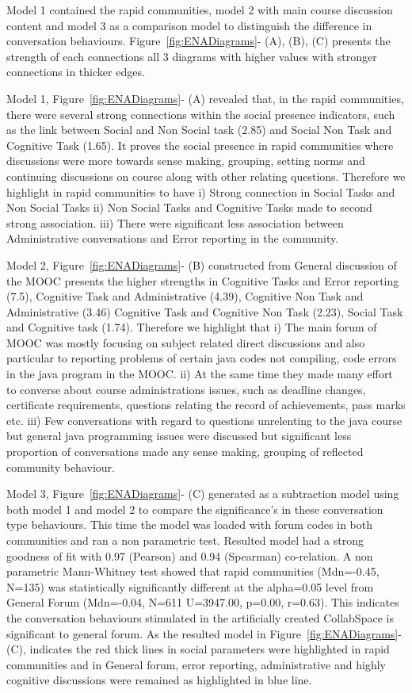 \documentclass[manuscript,screen,review]{acmart}
\begin{document}
Model 1 contained the rapid communities, model 2 with main course discussion content and model 3 as a comparison model to distinguish the difference in conversation behaviours.  Figure~\ref{fig:ENADiagrams}- (A), (B), (C) presents the strength of each connections all 3 diagrams with higher values with stronger connections in thicker edges. 

Model 1, Figure~\ref{fig:ENADiagrams}- (A) revealed that, in the rapid communities, there were several strong connections within the social presence indicators, such as the link between Social and Non Social task (2.85) and Social Non Task and Cognitive Task (1.65). It proves the social presence in rapid communities where discussions were more towards sense making, grouping, setting norms and continuing discussions on course along with other relating questions. Therefore we highlight in rapid communities to have i) Strong connection in Social Tasks and Non Social Tasks ii) Non Social Tasks and Cognitive Tasks made to second strong association. iii) There were significant less association between  Administrative conversations and Error reporting in the community. 

Model 2, Figure~\ref{fig:ENADiagrams}- (B) constructed from General discussion of the MOOC presents the higher strengths in Cognitive Tasks and Error reporting (7.5), Cognitive Task and Administrative (4.39), Cognitive Non Task and Administrative (3.46) Cognitive Task and Cognitive Non Task (2.23), Social Task and Cognitive task (1.74). Therefore we highlight that  i) The main forum of MOOC was mostly focusing on subject related direct discussions and also particular to reporting problems of certain java codes not compiling, code errors in the java program in the MOOC. ii) At the same time they made many effort to converse about course administrations issues, such as deadline changes, certificate requirements, questions relating the record of achievements, pass marks etc. iii) Few conversations with regard to questions unrelenting to the java course but general java programming issues were discussed but significant less proportion of conversations made any sense making, grouping of reflected community behaviour. 


Model 3, Figure~\ref{fig:ENADiagrams}- (C) generated as a subtraction model using both model 1 and model 2 to compare the significance's in these conversation type behaviours. This time the model was loaded with forum codes in both communities and ran a non parametric test. Resulted model had a strong goodness of fit with 0.97 (Pearson) and 0.94 (Spearman) co-relation. A non parametric Mann-Whitney test showed that rapid communities (Mdn=-0.45, N=135) was statistically significantly different at the alpha=0.05 level from General Forum (Mdn=-0.04, N=611 U=3947.00, p=0.00, r=0.63). This indicates the conversation behaviours stimulated in the artificially created CollabSpace is significant to general forum. As the resulted model in Figure~\ref{fig:ENADiagrams}-(C), indicates the red thick lines in social parameters were highlighted in rapid communities and in General forum, error reporting, administrative and highly cognitive discussions were remained as highlighted in blue line.
\end{document}
